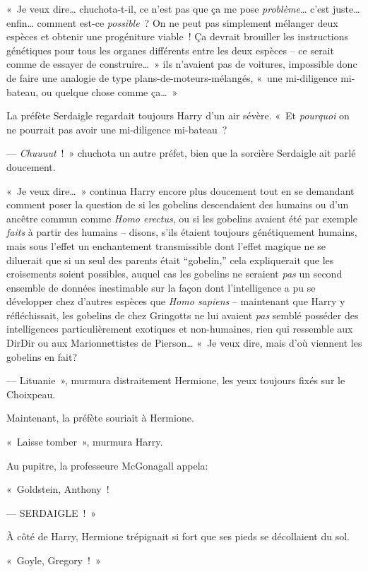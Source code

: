 «~Je veux dire… chuchota-t-il, ce n'est pas que ça me pose \emph{problème}… c'est juste… enfin… comment est-ce \emph{possible}~?
On ne peut pas simplement mélanger deux espèces et obtenir une progéniture viable~!
Ça devrait brouiller les instructions génétiques pour tous les organes différents entre les deux espèces -- ce serait comme de essayer de construire…~» ils n'avaient pas de voitures, impossible donc de faire une analogie de type plans-de-moteurs-mélangés, «~une mi-diligence mi-bateau, ou quelque chose comme ça…~»

La préfète Serdaigle regardait toujours Harry d'un air sévère.
«~Et \emph{pourquoi} on ne pourrait pas avoir une mi-diligence mi-bateau~?

--- \emph{Chuuuut}~!~» chuchota un autre préfet, bien que la sorcière Serdaigle ait parlé doucement.

«~Je veux dire…~» continua Harry encore plus doucement tout en se demandant comment poser la question de si les gobelins descendaient des humains ou d'un ancêtre commun comme \emph{Homo erectus}, ou si les gobelins avaient été par exemple \emph{faits} à partir des humains --
disons, s'ils étaient toujours génétiquement humains, mais sous l'effet un enchantement transmissible dont l'effet magique ne se diluerait que si un seul des parents était “gobelin,” cela expliquerait que les croisements soient possibles, auquel cas les gobelins ne seraient \emph{pas} un second ensemble de données inestimable sur la façon dont l'intelligence a pu se développer chez d'autres espèces que \emph{Homo sapiens} --
maintenant que Harry y réfléchissait, les gobelins de chez Gringotts ne lui avaient \emph{pas} semblé posséder des intelligences particulièrement exotiques et non-humaines, rien qui ressemble aux DirDir ou aux Marionnettistes de Pierson…
«~Je veux dire, mais d'où viennent les gobelins en fait?

--- Lituanie~», murmura distraitement Hermione, les yeux toujours fixés sur le Choixpeau.

Maintenant, la préfète souriait à Hermione.

«~Laisse tomber~», murmura Harry.

Au pupitre, la professeure McGonagall appela:

«~Goldstein, Anthony~!

--- SERDAIGLE~!~»

À côté de Harry, Hermione trépignait si fort que ses pieds se décollaient du sol.

«~Goyle, Gregory~!~»

